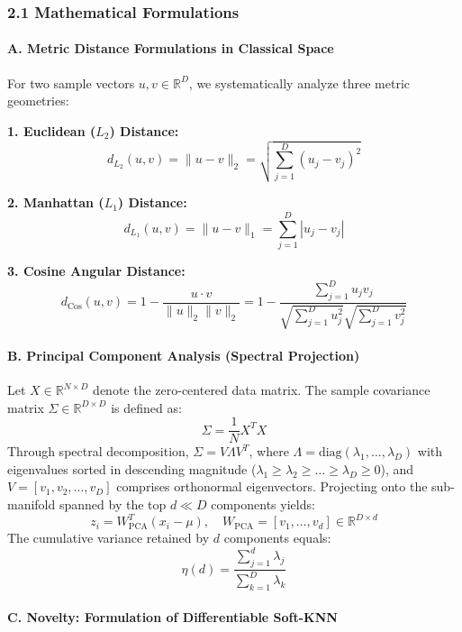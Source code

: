 \subsubsection{2.1 Mathematical
Formulations}\label{21-mathematical-formulations}

\paragraph{A. Metric Distance Formulations in Classical
Space}\label{a-metric-distance-formulations-in-classical-space}

For two sample vectors \(u, v \in \mathbb{R}^D\), we systematically
analyze three metric geometries:

\textbf{1. Euclidean (\(L_2\)) Distance:} \[
d_{L_2}(u, v) = \|u - v\|_2 = \sqrt{\sum_{j=1}^D (u_j - v_j)^2}
\]

\textbf{2. Manhattan (\(L_1\)) Distance:} \[
d_{L_1}(u, v) = \|u - v\|_1 = \sum_{j=1}^D |u_j - v_j|
\]

\textbf{3. Cosine Angular Distance:} \[
d_{\text{Cos}}(u, v) = 1 - \frac{u \cdot v}{\|u\|_2 \|v\|_2} = 1 - \frac{\sum_{j=1}^D u_j v_j}{\sqrt{\sum_{j=1}^D u_j^2} \sqrt{\sum_{j=1}^D v_j^2}}
\]

\paragraph{B. Principal Component Analysis (Spectral
Projection)}\label{b-principal-component-analysis-spectral-projection}

Let \(X \in \mathbb{R}^{N \times D}\) denote the zero-centered data
matrix. The sample covariance matrix
\(\Sigma \in \mathbb{R}^{D \times D}\) is defined as:
\[\Sigma = \frac{1}{N} X^T X\] Through spectral decomposition,
\(\Sigma = V \Lambda V^T\), where
\(\Lambda = \text{diag}(\lambda_1, \dots, \lambda_D)\) with eigenvalues
sorted in descending magnitude
(\(\lambda_1 \ge \lambda_2 \ge \dots \ge \lambda_D \ge 0\)), and
\(V = [v_1, v_2, \dots, v_D]\) comprises orthonormal eigenvectors.
Projecting onto the sub-manifold spanned by the top \(d \ll D\)
components yields:
\[z_i = W_{\text{PCA}}^T (x_i - \mu), \quad W_{\text{PCA}} = [v_1, \dots, v_d] \in \mathbb{R}^{D \times d}\]
The cumulative variance retained by \(d\) components equals:
\[\eta(d) = \frac{\sum_{j=1}^{d} \lambda_j}{\sum_{k=1}^{D} \lambda_k}\]

\paragraph{C. Novelty: Formulation of Differentiable
Soft-KNN}\label{c-novelty-formulation-of-differentiable-soft-knn}

